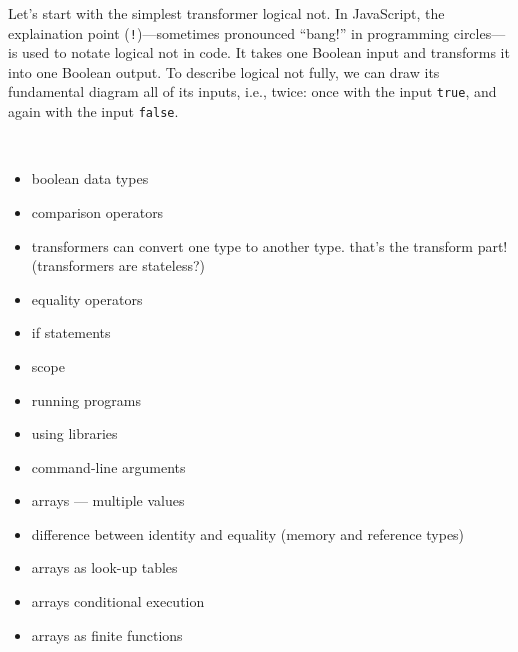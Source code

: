 Let's start with the simplest transformer logical \textsf{not}. In JavaScript, the explaination point (\texttt{!})---sometimes pronounced ``bang!'' in programming circles---is used to notate logical \textsf{not} in code. It takes one \textsf{Boolean} input and transforms it into one \textsf{Boolean} output. To describe logical \textsf{not} fully, we can draw its fundamental diagram all of its inputs, i.e., twice: once with the input \texttt{true}, and again with the input \texttt{false}.

\begin{figure}
  \\
  
  \caption{\label{conds:not-fundamental-diagram.tex}}
\end{figure}
\begin{itemize}
  \item boolean data types
  \item comparison operators
  \item transformers can convert one type to another type. that's the transform part! (transformers are stateless?)
  \item equality operators
  \item if statements
  \item scope
  \item running programs
  \item using libraries
  \item command-line arguments
  \item arrays --- multiple values
  \item difference between identity and equality (memory and reference types)
  \item arrays as look-up tables
  \item arrays conditional execution
  \item arrays as finite functions
\end{itemize}

